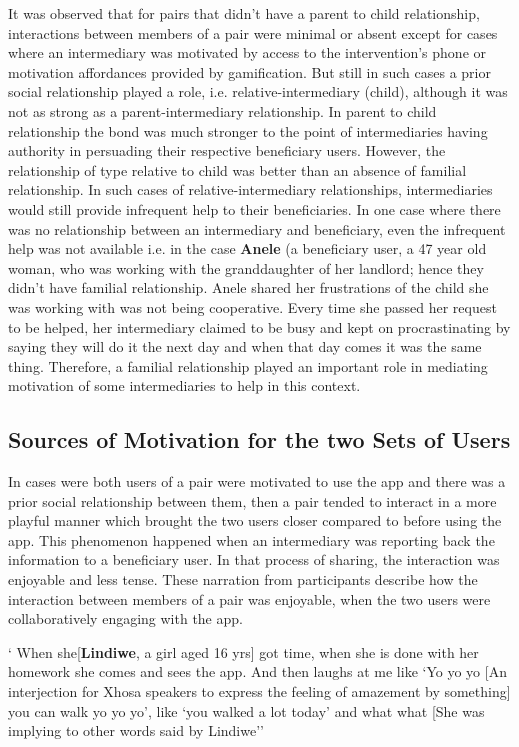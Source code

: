 It was observed that for pairs that didn't have a parent to child relationship, interactions between members of a pair were minimal or absent except for cases where an intermediary was motivated by access to the intervention's phone or motivation affordances provided by gamification. But still in such cases a prior social relationship played a role, i.e. relative-intermediary (child), although it was not as strong as a parent-intermediary relationship. In parent to child relationship the bond was much stronger to the point of intermediaries having authority in persuading their respective beneficiary users. However, the relationship of type relative to child was better than an absence of  familial relationship. In such cases of relative-intermediary relationships, intermediaries would still provide infrequent help to their beneficiaries.  In one case where there was no relationship between an intermediary and beneficiary, even the infrequent help was not available i.e. in the case \textbf{Anele} (a beneficiary user, a 47 year old woman, who was working with the granddaughter of her landlord; hence they didn't have familial relationship. Anele shared her frustrations of the child she was working with was not being cooperative.  Every time she passed her request to be helped, her intermediary claimed to be busy and kept on procrastinating by saying they will do it the next day and when that day comes it was the same thing. Therefore, a familial relationship played an important role in mediating motivation of some intermediaries to help in this context.   
\subsection{Sources of Motivation for the two Sets of Users}
In cases were both users of a pair were motivated to use the app and there was a prior social relationship between them, then a pair tended to interact in a more playful manner which brought the two users closer compared to before using the app. This phenomenon happened when an intermediary was reporting back the information to a beneficiary user. In that process of sharing, the interaction was enjoyable and less tense. These narration from participants describe how the interaction  between members of a pair was enjoyable, when the two users were collaboratively engaging with the app.

 {` When she[\textbf{Lindiwe}, a girl aged 16 yrs] got time, when she is done with her homework she comes and sees the app. And then laughs at me like `Yo yo yo [An interjection for Xhosa speakers to express the feeling of amazement by something] you can walk yo yo yo', like `you walked a lot today' and what what [She was implying to other words said by Lindiwe''}

